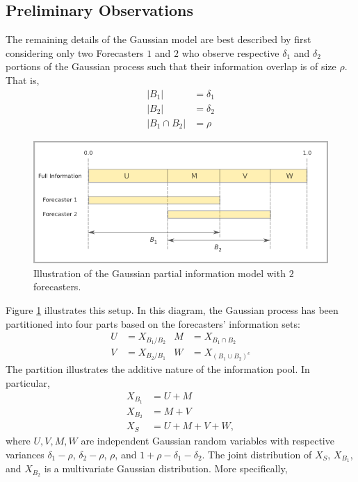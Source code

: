 \documentclass[11pt]{article}
\theoremstyle{definition}
\theoremstyle{definition}
\begin{document}
\subsection{Preliminary Observations}
\label{prelim}
The remaining details of the Gaussian model are best described by first considering only two Forecasters $1$ and $2$ who observe respective $\delta_1$ and
$\delta_2$ portions of the Gaussian process such that their information overlap is of size $\rho$. That is,
\begin{align*}
|B_1| &= \delta_1\\
|B_2| &= \delta_2\\
|B_1 \cap B_2| &= \rho
\end{align*}
\begin{figure}[t]
   \includegraphics[width = \textwidth]{N=2} %
   \caption{Illustration of the Gaussian partial information model with $2$ forecasters.}
   \label{diagram2}
\end{figure}
Figure \ref{diagram2} illustrates this setup.  In this diagram, the
Gaussian process has been partitioned into four parts based on the
forecasters' information sets:
\begin{align*}
 U &= X_{B_1 / B_2}
& M &= X_{B_1 \cap B_2}\\
 V &= X_{B_2 / B_1}
& W &= X_{(B_1 \cup B_2)^c}
\end{align*}
The partition illustrates the additive nature of the information pool. In particular,
\begin{align*}
X_{B_1} &= U + M\\
X_{B_2} &= M + V\\
X_S &= U+M+V+W,
\end{align*}
where $U, V, M, W$ are independent Gaussian random variables with respective variances
$\delta_1-\rho$, $\delta_2-\rho$, $\rho$, and $1+\rho-\delta_1 -
\delta_2$. The joint distribution of $X_{S}$, $X_{B_1}$, and $X_{B_2}$ is a
multivariate Gaussian distribution. More specifically,
\end{document}

